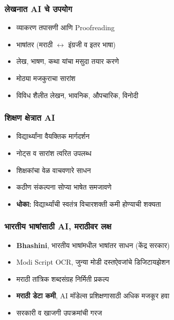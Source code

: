 \begin{frame}[fragile]\frametitle{लेखनात AI चे उपयोग}

\begin{itemize}
\item व्याकरण तपासणी आणि Proofreading
\item भाषांतर (मराठी $\leftrightarrow$ इंग्रजी व इतर भाषा)
\item लेख, भाषण, कथा यांचा मसुदा तयार करणे
\item मोठ्या मजकुराचा सारांश
\item विविध शैलीत लेखन, भावनिक, औपचारिक, विनोदी
\end{itemize}

\end{frame}

\begin{frame}[fragile]\frametitle{शिक्षण क्षेत्रात AI}

\begin{itemize}
\item विद्यार्थ्यांना वैयक्तिक मार्गदर्शन
\item नोट्स व सारांश त्वरित उपलब्ध
\item शिक्षकांचा वेळ वाचवणारे साधन
\item कठीण संकल्पना सोप्या भाषेत समजावणे
\item \textbf{धोका:} विद्यार्थ्यांची स्वतंत्र विचारशक्ती कमी होण्याची शक्यता
\end{itemize}

\end{frame}

\begin{frame}[fragile]\frametitle{भारतीय भाषांसाठी AI, मराठीवर लक्ष}

\begin{itemize}
\item \textbf{Bhashini}, भारतीय भाषांमधील भाषांतर साधन (केंद्र सरकार)
\item Modi Script OCR, जुन्या मोडी दस्तऐवजांचे डिजिटायझेशन
\item मराठी तांत्रिक शब्दसंग्रह निर्मिती प्रकल्प
\item \textbf{मराठी डेटा कमी}, AI मॉडेल्स प्रशिक्षणासाठी अधिक मजकूर हवा
\item सरकारी व खाजगी उपक्रमांची गरज
\end{itemize}

\end{frame}

